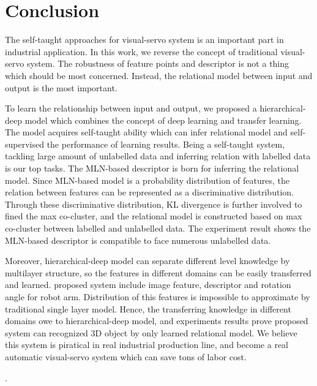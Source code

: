 \documentclass[journal]{IEEEtran}
\begin{document}
\section{Conclusion}
The self-taught approaches for visual-servo system is an important part in industrial application. In this work, we reverse the concept of traditional visual-servo system. The robustness of feature points and descriptor is not a thing which should be most concerned. Instead, the relational model between input and output is the most important. 

To learn the relationship between input and output, we proposed a hierarchical-deep model which combines the concept of deep learning and transfer learning. The model acquires self-taught ability which can infer relational model and self-supervised the performance of learning results. Being a self-taught system, tackling large amount of unlabelled data and inferring relation with labelled data is our top tasks. The MLN-based descriptor is born for inferring the relational model. Since MLN-based model is a probability distribution of features, the relation between features can be represented as a discriminative distribution. Through these discriminative distribution, KL divergence is further involved to fined the max co-cluster, and the relational model is constructed based on max co-cluster between labelled and unlabelled data. The experiment result shows the MLN-based descriptor is compatible to face numerous unlabelled data.

Moreover, hierarchical-deep model can separate different level knowledge by multilayer structure, so the features in different domains can be easily transferred and learned. proposed system include image feature, descriptor and rotation angle for robot arm. Distribution of this features is impossible to approximate by traditional single layer model. Hence, the transferring knowledge in different domains owe to hierarchical-deep model, and experiments results prove proposed system can recognized 3D object by only learned relational model. We believe this system is piratical in real industrial production line, and become a real automatic visual-servo system which can save tons of labor cost.





.
\ifCLASSOPTIONcaptionsoff
  \newpage
\fi
\end{document}
